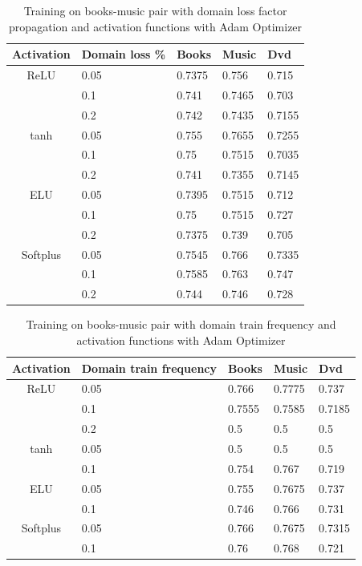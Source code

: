 \documentclass[11pt,a4paper]{article}
\begin{document}
\begin{table}[h]
\begin{center}
\begin{tabular}{|c|l|l|l|l|}
\hline
Activation & \multicolumn{1}{|p{1cm}|}{Domain loss \%}& Books & Music & Dvd \\
\hline
ReLU & 0.05 & 0.7375 & 0.756 & 0.715  \\
 & 0.1 & 0.741 & 0.7465 & 0.703 \\
 & 0.2 & 0.742 & 0.7435 & 0.7155 \\
\hline
tanh & 0.05 & 0.755 & 0.7655 & 0.7255 \\
 & 0.1 & 0.75 & 0.7515 & 0.7035 \\
 & 0.2 & 0.741 & 0.7355 & 0.7145 \\
\hline
ELU & 0.05 & 0.7395 & 0.7515 & 0.712 \\
 & 0.1 & 0.75 & 0.7515 & 0.727 \\
 & 0.2 & 0.7375 & 0.739 & 0.705 \\
\hline
Softplus & 0.05 & 0.7545 & 0.766 & 0.7335 \\
 & 0.1 & 0.7585 & 0.763 & 0.747 \\
 & 0.2 & 0.744 & 0.746 & 0.728 \\
\hline
\end{tabular}
\end{center}
\caption{ Training on books-music pair with domain loss factor propagation and activation functions with Adam Optimizer}
\label{alpha-activation-table}
\end{table}


\begin{table}[h]
\begin{center}
\begin{tabular}{|c|l|l|l|l|}
\hline
Activation & \multicolumn{1}{|p{1cm}|}{Domain train frequency}& Books & Music & Dvd \\
\hline
ReLU & 0.05 & 0.766 & 0.7775 & 0.737 \\
  & 0.1 & 0.7555 & 0.7585 & 0.7185 \\
  & 0.2 & 0.5 & 0.5 & 0.5 \\
\hline
tanh & 0.05 & 0.5 & 0.5 & 0.5  \\
  & 0.1 & 0.754 & 0.767 & 0.719 \\
\hline
ELU & 0.05 & 0.755 & 0.7675 & 0.737 \\
  & 0.1 & 0.746 & 0.766 & 0.731 \\
\hline
Softplus & 0.05 & 0.766 & 0.7675 & 0.7315 \\
  & 0.1 & 0.76 & 0.768 & 0.721 \\
\hline
\end{tabular}
\end{center}
\caption{ Training on books-music pair with domain train frequency and activation functions with Adam Optimizer}
\label{1d-activation-table}
\end{table}
\end{document}
